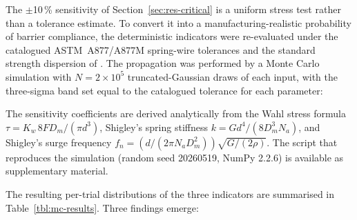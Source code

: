 The $\pm$10\,\% sensitivity of Section~\ref{sec:res-critical} is a
uniform stress test rather than a tolerance estimate. To convert it
into a manufacturing-realistic probability of barrier compliance, the
deterministic indicators were re-evaluated under the catalogued
ASTM~A877/A877M spring-wire tolerances and the standard strength
dispersion of \citet[\S~10-30]{shigley2020}. The propagation was
performed by a Monte Carlo simulation with $N=2\times 10^{5}$
truncated-Gaussian draws of each input, with the three-sigma band set
equal to the catalogued tolerance for each parameter:
\begin{center}
\footnotesize
\renewcommand{\arraystretch}{1.05}
\end{center}

\noindent The sensitivity coefficients are derived analytically from the
Wahl stress formula
$\tau=K_{w}\,8FD_{m}/(\pi d^{3})$, Shigley's spring stiffness
$k=Gd^{4}/(8D_{m}^{3}N_{a})$, and Shigley's surge frequency
$f_{n}=(d/(2\pi N_{a} D_{m}^{2}))\sqrt{G/(2\rho)}$. The script that
reproduces the simulation (random seed 20260519, NumPy 2.2.6) is
available as supplementary material.

The resulting per-trial distributions of the three indicators are
summarised in Table~\ref{tbl:mc-results}. Three findings emerge:

